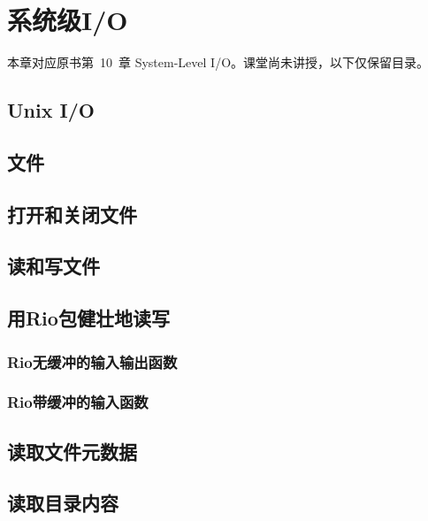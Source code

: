 \chapter{系统级I/O}

本章对应原书第~10~章 System-Level I/O。课堂尚未讲授，以下仅保留目录。

\section{Unix I/O}

\pending

\section{文件}

\pending

\section{打开和关闭文件}

\pending

\section{读和写文件}

\pending

\section{用Rio包健壮地读写}

\pending

\subsection{Rio无缓冲的输入输出函数}

\pending

\subsection{Rio带缓冲的输入函数}

\pending

\section{读取文件元数据}

\pending

\section{读取目录内容}

